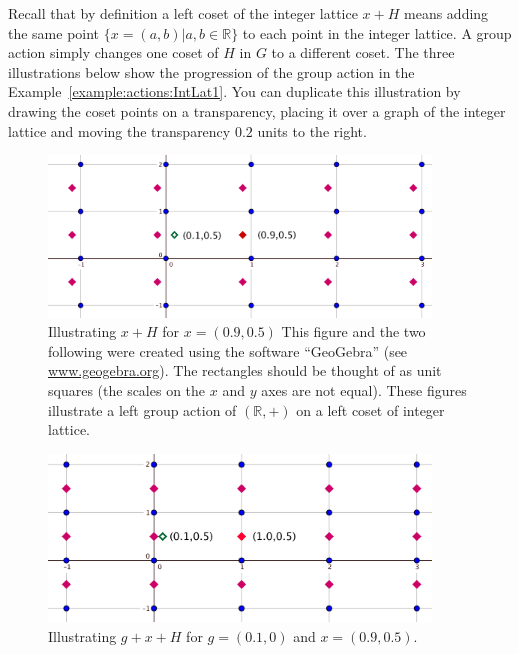 Recall that by definition a left coset of the integer lattice $x+H$  means adding the same point $\{x=(a,b)|a,b\in \mathbb{R}\}$ to each point in the integer lattice. A group action simply changes one coset of $H$ in $G$ to a different coset.  The three illustrations below show the progression of the group action  in the Example~\ref{example:actions:IntLat1}. You can duplicate this illustration by drawing the coset points on a transparency, placing it over a graph of the integer lattice and moving the transparency $0.2$ units to the right.

\begin{figure}[ht]
\begin{center}
\includegraphics[width=4.0in]{images/IntLat1.png}
\caption{Illustrating $x+H$ for $x=(0.9,0.5)$ This figure and the two following were created using the software ``GeoGebra'' (see \url{www.geogebra.org}).  
The rectangles should be thought of as unit squares (the scales on the $x$ and $y$ axes are not equal).   These figures illustrate a left group action of $(\mathbb{R},+)$ on a left coset of integer lattice.}
\label{fig:IntegerLattice1}
\end{center}
\end{figure}

\begin{figure}[ht]
\begin{center}
\includegraphics[width=4.0in]{images/IntLat2.png}
\caption{Illustrating $g+x+H$ for $g=(0.1,0)$ and $x=(0.9,0.5)$.}
\label{fig:IntegerLattice2}
\end{center}
\end{figure}


